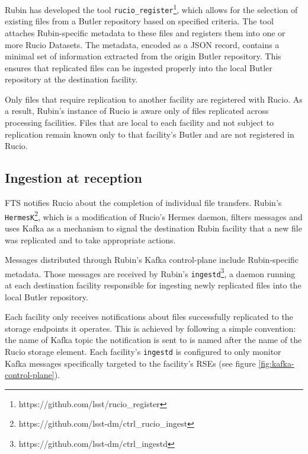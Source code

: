 \documentclass{webofc}
\begin{document}
Rubin has developed the tool \texttt{rucio\_register}\footnote{https://github.com/lsst/rucio\_register}, which allows for the selection of existing files from a Butler repository based on specified criteria. The tool attaches Rubin-specific metadata to these files and registers them into one or more Rucio Datasets. The metadata, encoded as a JSON record, contains a minimal set of information extracted from the origin Butler repository. This ensures that replicated files can be ingested properly into the local Butler repository at the destination facility.

Only files that require replication to another facility are registered with Rucio. As a result, Rubin's instance of Rucio is aware only of files replicated across processing facilities. Files that are local to each facility and not subject to replication remain known only to that facility's Butler and are not registered in Rucio.

\subsection{Ingestion at reception}
\label{ingestion}

FTS notifies Rucio about the completion of individual file transfers. Rubin's \texttt{HermesK}\footnote{https://github.com/lsst-dm/ctrl\_rucio\_ingest}, which is a modification of Rucio's Hermes daemon, filters messages and uses Kafka as a mechanism to signal the destination Rubin facility that a new file was replicated and to take appropriate actions.

Messages distributed through Rubin's Kafka control-plane include Rubin-specific metadata. Those messages are received by Rubin's \texttt{ingestd}\footnote{https://github.com/lsst-dm/ctrl\_ingestd}, a daemon running at each destination facility responsible for ingesting newly replicated files into the local Butler repository.

Each facility only receives notifications about files successfully replicated to the storage endpoints it operates. This is achieved by following a simple convention: the name of Kafka topic the notification is sent to is named after the name of the Rucio storage element. Each facility's \texttt{ingestd} is configured to only monitor Kafka messages specifically targeted to the facility's RSEs (see figure \ref{fig:kafka-control-plane}).
\end{document}

